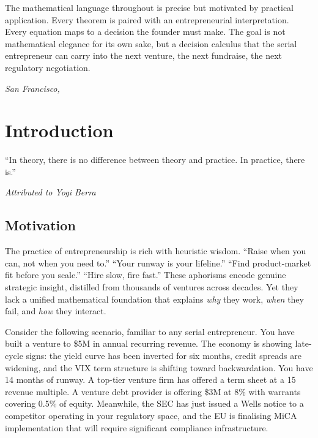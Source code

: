 \documentclass[12pt,a4paper,oneside]{book}
\theoremstyle{definition}
\theoremstyle{remark}
\begin{document}
The mathematical language throughout is precise but motivated by practical application.
Every theorem is paired with an entrepreneurial interpretation. Every equation maps to
a decision the founder must make. The goal is not mathematical elegance for its own sake,
but a decision calculus that the serial entrepreneur can carry into the next venture, the
next fundraise, the next regulatory negotiation.

\vspace{1cm}
\hfill\textit{San Francisco, \the\year}

\tableofcontents

\chapter{Introduction}\label{ch:intro}

\epigraph{``In theory, there is no difference between theory and practice.
In practice, there is.''}{\textit{Attributed to Yogi Berra}}

\section{Motivation}

The practice of entrepreneurship is rich with heuristic wisdom. ``Raise when you can,
not when you need to.'' ``Your runway is your lifeline.'' ``Find product-market fit
before you scale.'' ``Hire slow, fire fast.'' These aphorisms encode genuine strategic
insight, distilled from thousands of ventures across decades. Yet they lack a unified
mathematical foundation that explains \emph{why} they work, \emph{when} they fail, and
\emph{how} they interact.

Consider the following scenario, familiar to any serial entrepreneur. You have built a
venture to \$5M in annual recurring revenue. The economy is showing late-cycle signs:
the yield curve has been inverted for six months, credit spreads are widening, and the
VIX term structure is shifting toward backwardation. You have 14 months of runway. A
top-tier venture firm has offered a term sheet at a 15\texttimes{} revenue multiple. A
venture debt provider is offering \$3M at 8\% with warrants covering 0.5\% of equity.
Meanwhile, the SEC has just issued a Wells notice to a competitor operating in your
regulatory space, and the EU is finalising MiCA implementation that will require
significant compliance infrastructure.
\end{document}
